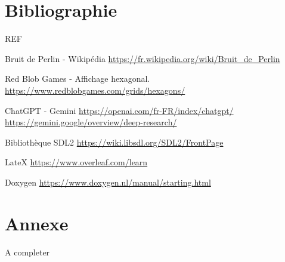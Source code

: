 \documentclass[11pt,a4paper]{article}
\begin{document}
\section{Bibliographie}

\begin{thebibliography}{REF}

	Bruit de Perlin - Wikipédia
	\url{https://fr.wikipedia.org/wiki/Bruit_de_Perlin}

	Red Blob Games - Affichage hexagonal.
	\url{https://www.redblobgames.com/grids/hexagons/}

	ChatGPT - Gemini
	\url{https://openai.com/fr-FR/index/chatgpt/}
	\url{https://gemini.google/overview/deep-research/}

	Bibliothèque SDL2
	\url{https://wiki.libsdl.org/SDL2/FrontPage}

	LateX
	\url{https://www.overleaf.com/learn}

	Doxygen
	\url{https://www.doxygen.nl/manual/starting.html}

\end{thebibliography}

\newpage

\section{Annexe}

A completer
\end{document}
